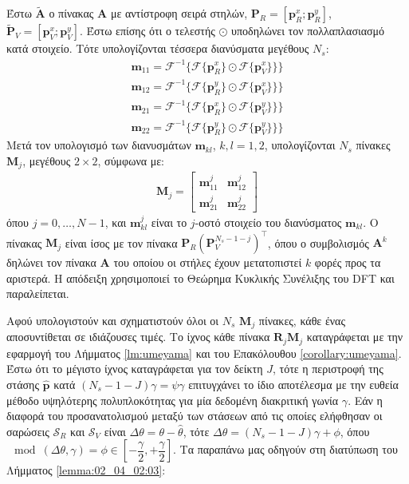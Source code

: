 Έστω $\widetilde{\bm{A}}$ ο πίνακας $\bm{A}$ με αντίστροφη σειρά στηλών,
$\bm{P}_R = [\bm{p}_R^x; \bm{p}_R^y]$,
$\widetilde{\bm{P}}_V = [\bm{p}_V^x; \bm{p}_V^y]$. Έστω επίσης ότι ο τελεστής
$\odot$ υποδηλώνει τον πολλαπλασιασμό κατά στοιχείο. Τότε υπολογίζονται
τέσσερα διανύσματα μεγέθους $N_s$:
\begin{align}
  \bm{m}_{11} = \mathcal{F}^{-1}\{ \mathcal{F}\{\bm{p}_R^x\} \odot \mathcal{F}\{\bm{p}_V^x\} \} \} \nonumber \\
  \bm{m}_{12} = \mathcal{F}^{-1}\{ \mathcal{F}\{\bm{p}_R^y\} \odot \mathcal{F}\{\bm{p}_V^x\} \} \} \nonumber \\
  \bm{m}_{21} = \mathcal{F}^{-1}\{ \mathcal{F}\{\bm{p}_R^x\} \odot \mathcal{F}\{\bm{p}_V^y\} \} \} \nonumber \\
  \bm{m}_{22} = \mathcal{F}^{-1}\{ \mathcal{F}\{\bm{p}_R^y\} \odot \mathcal{F}\{\bm{p}_V^y\} \} \} \nonumber
\end{align}
Μετά τον υπολογισμό των διανυσμάτων $\bm{m}_{kl}$, $k,l = 1,2$, υπολογίζονται
$N_s$ πίνακες $\bm{M}_j$, μεγέθους $2\times2$, σύμφωνα με:
\begin{align}
  \bm{M}_j =
  \begin{bmatrix}
    \bm{m}_{11}^j & \bm{m}_{12}^j \\
    \bm{m}_{21}^j & \bm{m}_{22}^j
  \end{bmatrix}
\end{align}
όπου $j = 0,\dots,N-1$, και $\bm{m}_{kl}^j$ είναι το $j$-οστό στοιχείο του
διανύσματος $\bm{m}_{kl}$. Ο πίνακας $\bm{M}_j$ είναι ίσος με τον πίνακα
$\bm{P}_R (\bm{P}_V^{N_s-1-j})^\top$, όπου ο συμβολισμός $\bm{A}^k$  δηλώνει
τον πίνακα $\bm{A}$ του οποίου οι στήλες έχουν μετατοπιστεί $k$ φορές προς τα
αριστερά. Η απόδειξη χρησιμοποιεί το Θεώρημα Κυκλικής Συνέλιξης του DFT και
παραλείπεται.

Αφού υπολογιστούν και σχηματιστούν όλοι οι $N_s$ $\bm{M}_j$ πίνακες, κάθε ένας
αποσυντίθεται σε ιδιάζουσες τιμές. Το ίχνος κάθε πίνακα $\bm{R}_j \bm{M}_j$
καταγράφεται με την εφαρμογή του Λήμματος \ref{lm:umeyama} και του Επακόλουθου
\ref{corollary:umeyama}. Έστω ότι το μέγιστο ίχνος καταγράφεται για τον δείκτη
$J$, τότε η περιστροφή της στάσης $\hat{\bm{p}}$ κατά $(N_s-1-J)\gamma =
\psi\gamma$ επιτυγχάνει το ίδιο αποτέλεσμα με την ευθεία μέθοδο υψηλότερης
πολυπλοκότητας για μία δεδομένη διακριτική γωνία $\gamma$. Εάν η διαφορά του
προσανατολισμού μεταξύ των στάσεων από τις οποίες ελήφθησαν οι σαρώσεις
$\mathcal{S}_R$ και $\mathcal{S}_V$ είναι $\Delta\theta = \theta-\hat{\theta}$,
τότε $\Delta\theta = (N_s-1-J)\gamma + \phi$, όπου
$\mod(\Delta\theta, \gamma) = \phi \in [-\dfrac{\gamma}{2},+\dfrac{\gamma}{2}]$.
Τα παραπάνω μας οδηγούν στη διατύπωση του Λήμματος \ref{lemma:02_04_02:03}:

